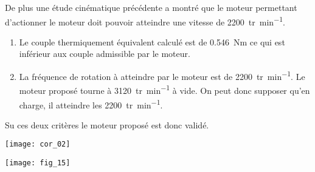 De plus une étude cinématique précédente a montré que le moteur permettant d'actionner le moteur doit pouvoir atteindre une vitesse de \SI{2200}{tr.min^{-1}}.

\fi



\ifprof
\begin{corrige}
\begin{enumerate}
\item Le couple thermiquement équivalent calculé est de \SI{0,546}{Nm} ce qui est inférieur aux couple admissible par le moteur. 
\item La fréquence de rotation à atteindre par le moteur est de \SI{2200}{tr.min^{-1}}. Le moteur proposé tourne à \SI{3120}{tr.min^{-1}} à vide. On peut donc supposer qu'en charge, il atteindre les \SI{2200}{tr.min^{-1}}.
\end{enumerate}
Su ces deux critères le moteur proposé est donc validé. 
\end{corrige}
\else
\fi

\ifprof
\else

\ifcolle
\else
{}
\fi
\fi



\ifprof
\begin{center}
\texttt{[image: cor\_02]}
\end{center}

\else


\begin{center}
\texttt{[image: fig\_15]}
\end{center}
\fi

